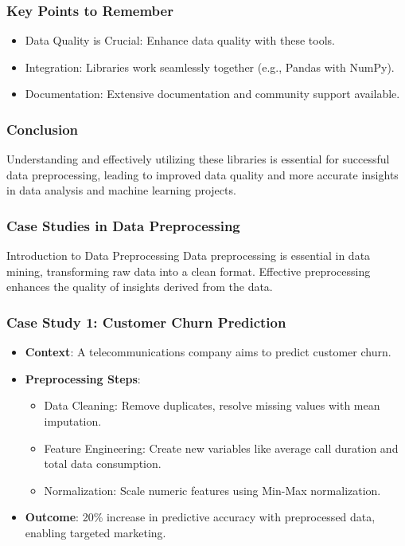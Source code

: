 \documentclass{beamer}
\begin{document}
\begin{frame}
    \frametitle{Key Points to Remember}
    \begin{itemize}
        \item Data Quality is Crucial: Enhance data quality with these tools.
        \item Integration: Libraries work seamlessly together (e.g., Pandas with NumPy).
        \item Documentation: Extensive documentation and community support available.
    \end{itemize}
\end{frame}

\begin{frame}
    \frametitle{Conclusion}
    Understanding and effectively utilizing these libraries is essential for successful data preprocessing, leading to improved data quality and more accurate insights in data analysis and machine learning projects.
\end{frame}

\begin{frame}[fragile]
    \frametitle{Case Studies in Data Preprocessing}
    \begin{block}{Introduction to Data Preprocessing}
        Data preprocessing is essential in data mining, transforming raw data into a clean format. Effective preprocessing enhances the quality of insights derived from the data.
    \end{block}
\end{frame}

\begin{frame}[fragile]
    \frametitle{Case Study 1: Customer Churn Prediction}
    \begin{itemize}
        \item \textbf{Context}: A telecommunications company aims to predict customer churn.
        \item \textbf{Preprocessing Steps}:
        \begin{itemize}
            \item Data Cleaning: Remove duplicates, resolve missing values with mean imputation.
            \item Feature Engineering: Create new variables like average call duration and total data consumption.
            \item Normalization: Scale numeric features using Min-Max normalization.
        \end{itemize}
        \item \textbf{Outcome}: 20\% increase in predictive accuracy with preprocessed data, enabling targeted marketing.
    \end{itemize}
\end{frame}
\end{document}
